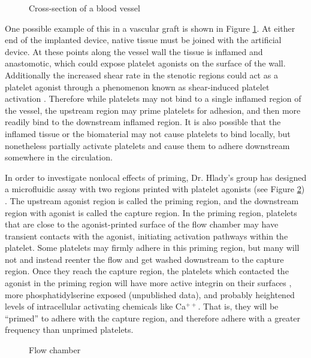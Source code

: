 \begin{figure}
  \centering
  
  \caption{Cross-section of a blood vessel}
  \label{fig:blood-vessel}
\end{figure}

One possible example of this in a vascular graft is shown in Figure
\ref{fig:blood-vessel}. At either end of the implanted device, native
tissue must be joined with the artificial device. At these points
along the vessel wall the tissue is inflamed and anastomotic, which
could expose platelet agonists on the surface of the
wall. Additionally the increased shear rate in the stenotic regions
could act as a platelet agonist through a phenomenon known as
shear-induced platelet activation
\cite{Fogelson2015,Kroll96,Shankaran2003}. Therefore while platelets
may not bind to a single inflamed region of the vessel, the upstream
region may prime platelets for adhesion, and then more readily bind to
the downstream inflamed region. It is also possible that the inflamed
tissue or the biomaterial may not cause platelets to bind locally, but
nonetheless partially activate platelets and cause them to adhere
downstream somewhere in the circulation.
		
In order to investigate nonlocal effects of priming, Dr. Hlady's group
has designed a microfluidic assay with two regions printed with
platelet agonists (see Figure \ref{fig:flow-chamber})
\cite{Corum2012}. The upstream agonist region is called the priming
region, and the downstream region with agonist is called the capture
region. In the priming region, platelets that are close to the
agonist-printed surface of the flow chamber may have transient
contacts with the agonist, initiating activation pathways within the
platelet. Some platelets may firmly adhere in this priming region, but
many will not and instead reenter the flow and get washed downstream
to the capture region. Once they reach the capture region, the
platelets which contacted the agonist in the priming region will have
more active integrin on their surfaces \cite{Corum2012}, more
phosphatidylserine exposed (unpublished data), and probably heightened
levels of intracellular activating chemicals like Ca$^{++}$. That is,
they will be ``primed'' to adhere with the capture region, and
therefore adhere with a greater frequency than unprimed platelets.

\begin{figure}
  \centering
  
  \caption{Flow chamber}
  \label{fig:flow-chamber}
\end{figure}

